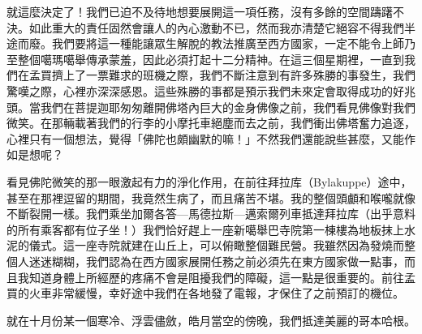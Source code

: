 就這麼決定了！我們已迫不及待地想要展開這一項任務，沒有多餘的空間躊躇不決。如此重大的責任固然會讓人的內心激動不已，然而我亦清楚它絕容不得我們半途而廢。我們要將這一種能讓眾生解脫的教法推廣至西方國家，一定不能令上師乃至整個噶瑪噶舉傳承蒙羞，因此必須打起十二分精神。在這三個星期裡，一直到我們在孟買擠上了一票難求的班機之際，我們不斷注意到有許多殊勝的事發生，我們驚嘆之際，心裡亦深深感恩。這些殊勝的事都是預示我們未來定會取得成功的好兆頭。當我們在菩提迦耶匆匆離開佛塔內巨大的金身佛像之前，我們看見佛像對我們微笑。在那輛載著我們的行李的小摩托車絕塵而去之前，我們衝出佛塔奮力追逐，心裡只有一個想法，覺得「佛陀也頗幽默的嘛！」不然我們還能說些甚麼，又能作如是想呢？

看見佛陀微笑的那一眼激起有力的淨化作用，在前往拜拉库（Bylakuppe）途中，甚至在那裡逗留的期間，我竟然生病了，而且痛苦不堪。我的整個頭顱和喉嚨就像不斷裂開一樣。我們乘坐加爾各答---馬德拉斯---邁索爾列車抵達拜拉库（出乎意料的所有乘客都有位子坐！）我們恰好趕上一座新噶舉巴寺院第一棟樓為地板抹上水泥的儀式。這一座寺院就建在山丘上，可以俯瞰整個難民營。我雖然因為發燒而整個人迷迷糊糊，我們認為在西方國家展開任務之前必須先在東方國家做一點事，而且我知道身體上所經歷的疼痛不會是阻擾我們的障礙，這一點是很重要的。前往孟買的火車非常緩慢，幸好途中我們在各地發了電報，才保住了之前預訂的機位。

就在十月份某一個寒冷、浮雲儘斂，皓月當空的傍晚，我們抵達美麗的哥本哈根。
